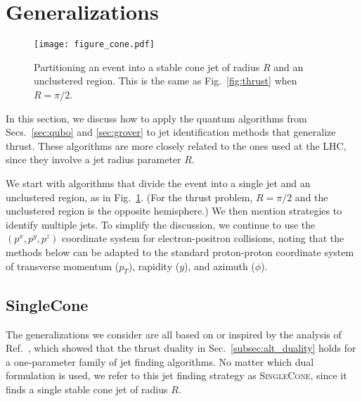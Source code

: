 \documentclass[aps,prd,twocolumn,superscriptaddress,preprintnumbers,nofootinbib,longbibliography,floatfix]{revtex4-1}
\DeclareRobustCommand{\Sec}[1]{Sec.~\ref{#1}}
\DeclareRobustCommand{\Secs}[2]{Secs.~\ref{#1} and \ref{#2}}
\DeclareRobustCommand{\Fig}[1]{Fig.~\ref{#1}}
\DeclareRobustCommand{\Ref}[1]{Ref.~\cite{#1}}
\begin{document}
%
%

\section{Generalizations}
\label{sec:generalize}


\begin{figure}
\texttt{[image: figure\_cone.pdf]}
\caption{Partitioning an event into a stable cone jet of radius $R$ and an unclustered region.  This is the same as \Fig{fig:thrust} when $R = \pi/2$.}
\label{fig:cone}
\end{figure}

In this section, we discuss how to apply the quantum algorithms from \Secs{sec:qubo}{sec:grover} to jet identification methods that generalize thrust.
%
These algorithms are more closely related to the ones used at the \ac{LHC}, since they involve a jet radius parameter $R$.


We start with algorithms that divide the event into a single jet and an unclustered region, as in \Fig{fig:cone}.
%
(For the thrust problem, $R = \pi/2$ and the unclustered region is the opposite hemisphere.)
%
We then mention strategies to identify multiple jets.
%
To simplify the discussion, we continue to use the $(p^x,p^y,p^z)$ coordinate system for electron-positron collisions, noting that the methods below can be adapted to the standard proton-proton coordinate system of transverse momentum ($p_T$), rapidity ($y$), and azimuth ($\phi$).


\subsection{SingleCone}
\label{subsec:separated_at_birth}

The generalizations we consider are all based on or inspired by the analysis of \Ref{Thaler:2015uja}, which showed that the thrust duality in \Sec{subsec:alt_duality} holds for a one-parameter family of jet finding algorithms.
%
No matter which dual formulation is used, we refer to this jet finding strategy as \textsc{SingleCone}, since it finds a single stable cone jet of radius $R$.
\end{document}
